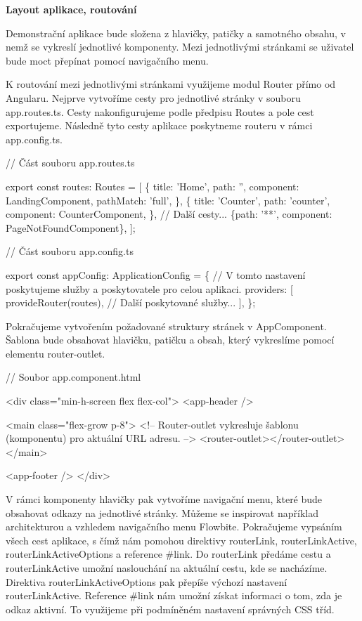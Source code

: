 \begin{flushleft}
  \textbf{Layout aplikace, routování}
\end{flushleft}

Demonstrační aplikace bude složena z hlavičky, patičky a samotného obsahu, v nemž se vykreslí jednotlivé komponenty. 
Mezi jednotlivými stránkami se uživatel bude moct přepínat pomocí navigačního menu.

K routování mezi jednotlivými stránkami využijeme modul Router přímo od Angularu. Nejprve vytvoříme cesty pro jednotlivé stránky v souboru app.routes.ts. 
Cesty nakonfigurujeme podle předpisu Routes a pole cest exportujeme. Následně tyto cesty aplikace poskytneme routeru v rámci app.config.ts.

\begin{prog}
// Část souboru app.routes.ts

export const routes: Routes = [
  \{
    title: 'Home',
    path: '',
    component: LandingComponent,
    pathMatch: 'full',
  \},
  \{
    title: 'Counter',
    path: 'counter',
    component: CounterComponent,
  \},
  // Další cesty...
  \{path: '**', component: PageNotFoundComponent\},
];

// Část souboru app.config.ts

export const appConfig: ApplicationConfig = \{
  // V tomto nastavení poskytujeme služby a poskytovatele pro celou aplikaci.
  providers: [
    provideRouter(routes),
    // Další poskytované služby...
  ],
\};
\end{prog}

Pokračujeme vytvořením požadované struktury stránek v AppComponent. Šablona bude obsahovat hlavičku, patičku a obsah, který vykreslíme pomocí elementu router-outlet. 

\begin{prog}
// Soubor app.component.html

<div class="min-h-screen flex flex-col">
  <app-header />

  <main class="flex-grow p-8">
    <!-- Router-outlet vykresluje šablonu (komponentu) pro aktuální URL adresu. -->
    <router-outlet></router-outlet>
  </main>

  <app-footer />
</div>
\end{prog}

V rámci komponenty hlavičky pak vytvoříme navigační menu, které bude obsahovat odkazy na jednotlivé stránky. 
Můžeme se inspirovat například architekturou a vzhledem navigačního menu Flowbite. 
Pokračujeme vypsáním všech cest aplikace, s čímž nám pomohou direktivy routerLink, routerLinkActive, routerLinkActiveOptions a reference \#link. 
Do routerLink předáme cestu a routerLinkActive umožní naslouchání na aktuální cestu, kde se nacházíme. Direktiva routerLinkActiveOptions pak přepíše výchozí nastavení routerLinkActive.
Reference \#link nám umožní získat informaci o tom, zda je odkaz aktivní. To využijeme při podmíněném nastavení správných CSS tříd.

